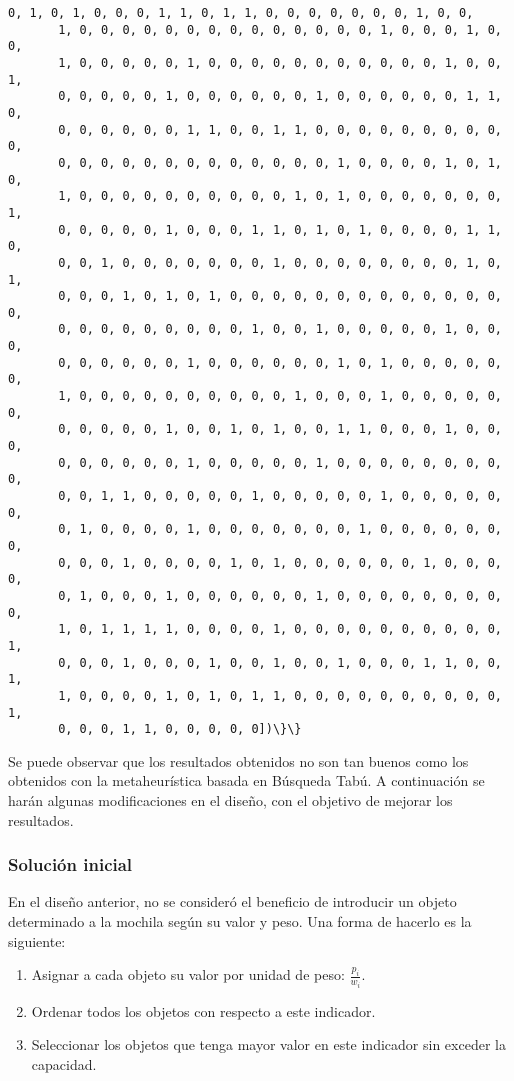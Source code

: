 \documentclass[11pt]{article}
\begin{document}
\begin{Verbatim}[commandchars=\\\{\}]
       0, 1, 0, 1, 0, 0, 0, 1, 1, 0, 1, 1, 0, 0, 0, 0, 0, 0, 0, 1, 0, 0,
       1, 0, 0, 0, 0, 0, 0, 0, 0, 0, 0, 0, 0, 0, 0, 1, 0, 0, 0, 1, 0, 0,
       1, 0, 0, 0, 0, 0, 1, 0, 0, 0, 0, 0, 0, 0, 0, 0, 0, 0, 1, 0, 0, 1,
       0, 0, 0, 0, 0, 1, 0, 0, 0, 0, 0, 0, 1, 0, 0, 0, 0, 0, 0, 1, 1, 0,
       0, 0, 0, 0, 0, 0, 1, 1, 0, 0, 1, 1, 0, 0, 0, 0, 0, 0, 0, 0, 0, 0,
       0, 0, 0, 0, 0, 0, 0, 0, 0, 0, 0, 0, 0, 1, 0, 0, 0, 0, 1, 0, 1, 0,
       1, 0, 0, 0, 0, 0, 0, 0, 0, 0, 0, 1, 0, 1, 0, 0, 0, 0, 0, 0, 0, 1,
       0, 0, 0, 0, 0, 1, 0, 0, 0, 1, 1, 0, 1, 0, 1, 0, 0, 0, 0, 1, 1, 0,
       0, 0, 1, 0, 0, 0, 0, 0, 0, 0, 1, 0, 0, 0, 0, 0, 0, 0, 0, 1, 0, 1,
       0, 0, 0, 1, 0, 1, 0, 1, 0, 0, 0, 0, 0, 0, 0, 0, 0, 0, 0, 0, 0, 0,
       0, 0, 0, 0, 0, 0, 0, 0, 0, 1, 0, 0, 1, 0, 0, 0, 0, 0, 1, 0, 0, 0,
       0, 0, 0, 0, 0, 0, 1, 0, 0, 0, 0, 0, 0, 1, 0, 1, 0, 0, 0, 0, 0, 0,
       1, 0, 0, 0, 0, 0, 0, 0, 0, 0, 0, 1, 0, 0, 0, 1, 0, 0, 0, 0, 0, 0,
       0, 0, 0, 0, 0, 1, 0, 0, 1, 0, 1, 0, 0, 1, 1, 0, 0, 0, 1, 0, 0, 0,
       0, 0, 0, 0, 0, 0, 1, 0, 0, 0, 0, 0, 1, 0, 0, 0, 0, 0, 0, 0, 0, 0,
       0, 0, 1, 1, 0, 0, 0, 0, 0, 1, 0, 0, 0, 0, 0, 1, 0, 0, 0, 0, 0, 0,
       0, 1, 0, 0, 0, 0, 1, 0, 0, 0, 0, 0, 0, 0, 1, 0, 0, 0, 0, 0, 0, 0,
       0, 0, 0, 1, 0, 0, 0, 0, 1, 0, 1, 0, 0, 0, 0, 0, 0, 1, 0, 0, 0, 0,
       0, 1, 0, 0, 0, 1, 0, 0, 0, 0, 0, 0, 1, 0, 0, 0, 0, 0, 0, 0, 0, 0,
       1, 0, 1, 1, 1, 1, 0, 0, 0, 0, 1, 0, 0, 0, 0, 0, 0, 0, 0, 0, 0, 1,
       0, 0, 0, 1, 0, 0, 0, 1, 0, 0, 1, 0, 0, 1, 0, 0, 0, 1, 1, 0, 0, 1,
       1, 0, 0, 0, 0, 1, 0, 1, 0, 1, 1, 0, 0, 0, 0, 0, 0, 0, 0, 0, 0, 1,
       0, 0, 0, 1, 1, 0, 0, 0, 0, 0])\}\}

    \end{Verbatim}

    Se puede observar que los resultados obtenidos no son tan buenos como
los obtenidos con la metaheurística basada en Búsqueda Tabú. A
continuación se harán algunas modificaciones en el diseño, con el
objetivo de mejorar los resultados.

    \subsubsection{Solución inicial}\label{soluciuxf3n-inicial}

En el diseño anterior, no se consideró el beneficio de introducir un
objeto determinado a la mochila según su valor y peso. Una forma de
hacerlo es la siguiente:

\begin{enumerate}
\def\labelenumi{\arabic{enumi}.}
\item
  Asignar a cada objeto su valor por unidad de peso:
  \(\frac{p_{i}}{w_{i}}\).
\item
  Ordenar todos los objetos con respecto a este indicador.
\item
  Seleccionar los objetos que tenga mayor valor en este indicador sin
  exceder la capacidad.
\end{enumerate}
\end{document}
